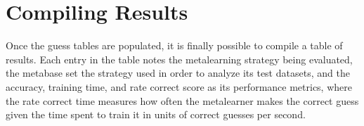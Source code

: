 \section{Compiling Results}
Once the guess tables are populated, it is finally possible to compile a table
of results. Each entry in the table notes the metalearning strategy being
evaluated, the metabase set the strategy used in order to analyze its test
datasets, and the accuracy, training time, and rate correct score as its
performance metrics, where the rate correct time measures how often the
metalearner makes the correct guess given the time spent to train it in
units of correct guesses per second.
